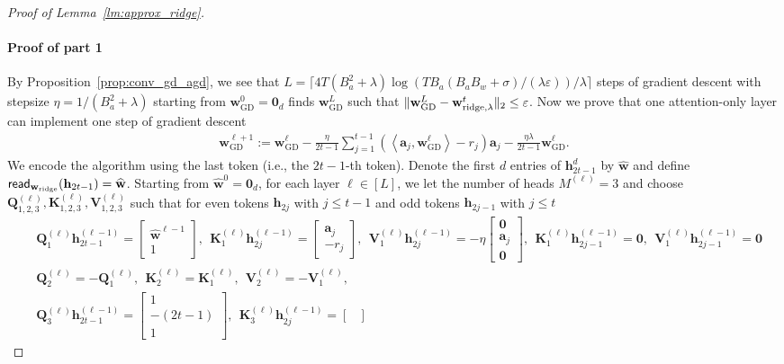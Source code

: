 \documentclass[10pt]{article}
\renewcommand{\hat}{\widehat}
\newcommand{\eps}{\varepsilon}
\newcommand{\<}{\left\langle}
\renewcommand{\>}{\right\rangle}
\renewcommand{\bQ}{\mathbf{Q}}
\newcommand{\bzero}{{\mathbf 0}}
\renewcommand{\read}{{\sf read}}
\newcommand{\ridge}{{\rm ridge}}
\newcommand{\GD}{{\mathrm{GD}}}
\newcommand{\partd}{{d}}
\newcommand{\ssl}{{{\ell}}}
\def\bK{{\mathbf K}}
\def\bQ{{\mathbf Q}}
\def\bV{{\mathbf V}}
\def\ba{{\mathbf a}}
\def\bh{{\mathbf h}}
\def\bw{{\mathbf w}}
\begin{document}
\begin{proof}[Proof of Lemma~\ref{lm:approx_ridge}]
\paragraph{Proof of part 1}
By Proposition~\ref{prop:conv_gd_agd}, we see that $L=\lceil4T(B_a^2+\lambda)\log({TB_a(B_aB_w+\sigma)}/({\lambda}\eps))/\lambda\rceil$ steps of gradient descent with stepsize $\eta=1/(B_a^2+\lambda)$ starting from $\bw_{\GD}^0=\bzero_d$ finds $\bw^L_\GD$ such that $\|\bw^L_{\GD}-\bw^t_{\ridge,\lambda}\|_2\leq\eps$.
Now we prove that one  attention-only layer can implement one step of gradient descent
\begin{align*}
    \bw^{\ssl+1}_{\GD}:=\bw^{\ssl}_{\GD}- \frac{\eta}{2t-1}\sum_{j=1}^{t-1}(\<\ba_j,\bw^\ssl_{\GD}\>-r_j)\ba_j- \frac{\eta\lambda}{2t-1}\bw^\ssl_{\GD}.
\end{align*}
We encode the algorithm using the last token (i.e., the $2t-1$-th token).
Denote the first $d$ entries of $\bh_{2t-1}^{\partd}$ by $\hat\bw$ and  define $\read_{\bw_{\ridge}}(\bh_{2t-1})=\hat\bw$. Starting from $\hat\bw^{0}=\bzero_d$, for each layer $\ell\in[L]$, we let the number of heads $M^{(\ell)}=3$ and  choose $\bQ_{1,2,3}^{(\ell)},\bK_{1,2,3}^{(\ell)},\bV_{1,2,3}^{(\ell)}$ such that for even tokens $\bh_{2j}$ with $j\leq t-1$ and odd tokens $\bh_{2j-1}$ with $j\leq t$
\begin{align*}
    &\bQ_1^{(\ell)}\bh^{(\ell-1)}_{2t-1}=\begin{bmatrix}
        \hat\bw^{\ell-1}\\ 1
    \end{bmatrix},~~ \bK_1^{(\ell)}\bh^{(\ell-1)}_{2j}=\begin{bmatrix}
        \ba_j\\ -r_j
    \end{bmatrix},~~ \bV_1^{(\ell)}\bh^{(\ell-1)}_{2j}=-\eta\begin{bmatrix}
        \bzero\\ \ba_j \\ \bzero
    \end{bmatrix},~~
    \bK_1^{(\ell)}\bh^{(\ell-1)}_{2j-1}=\bzero, ~~\bV_1^{(\ell)}\bh^{(\ell-1)}_{2j-1}=\bzero
    \\
    &
    \bQ_2^{(\ell)}=-\bQ_1^{(\ell)},~~ \bK_2^{(\ell)}=\bK_1^{(\ell)},~~  \bV_2^{(\ell)}=-\bV_1^{(\ell)},\\
     &
     \bQ_3^{(\ell)}\bh^{(\ell-1)}_{2t-1}=\begin{bmatrix}
         1\\-(2t-1)\\ 1
    \end{bmatrix},~~ \bK_3^{(\ell)}\bh^{(\ell-1)}_{2j}=\begin{bmatrix}

\end{bmatrix}
\end{align*}
\end{proof}
\end{document}
